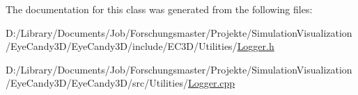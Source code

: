The documentation for this class was generated from the following files\+:\begin{DoxyCompactItemize}
\item 
D\+:/\+Library/\+Documents/\+Job/\+Forschungsmaster/\+Projekte/\+Simulation\+Visualization/\+Eye\+Candy3\+D/\+Eye\+Candy3\+D/include/\+E\+C3\+D/\+Utilities/\mbox{\hyperlink{_logger_8h}{Logger.\+h}}\item 
D\+:/\+Library/\+Documents/\+Job/\+Forschungsmaster/\+Projekte/\+Simulation\+Visualization/\+Eye\+Candy3\+D/\+Eye\+Candy3\+D/src/\+Utilities/\mbox{\hyperlink{_logger_8cpp}{Logger.\+cpp}}\end{DoxyCompactItemize}
